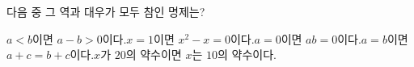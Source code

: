 다음 중 그 역과 대우가 모두 참인 명제는? 
\begin{choicesv}{$a<b$이면 $a-b>0$이다.}{$x=1$이면 $x^2-x=0$이다.}{$a=0$이면 $ab=0$이다.}{$a=b$이면 $a+c=b+c$이다.}{$x$가 $20$의 약수이면 $x$는 $10$의 약수이다.}\end{choicesv}
